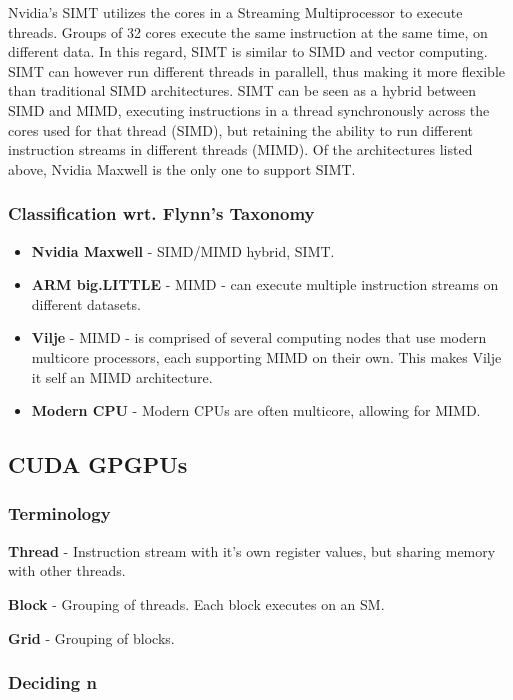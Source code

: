 \documentclass[paper=a4, fontsize=11pt]{scrartcl} %
\numberwithin{equation}{section} %
\numberwithin{figure}{section} %
\numberwithin{table}{section} %
\begin{document}
Nvidia's SIMT utilizes the cores in a Streaming Multiprocessor to execute threads.
Groups of 32 cores execute the same instruction at the same time, on different data.
In this regard, SIMT is similar to SIMD and vector computing.
SIMT can however run different threads in parallell, thus making it more flexible than traditional SIMD architectures.
SIMT can be seen as a hybrid between SIMD and MIMD, executing instructions in a thread synchronously across the cores used for that thread (SIMD), but retaining the ability to run different instruction streams in different threads (MIMD).
Of the architectures listed above, Nvidia Maxwell is the only one to support SIMT.

\subsubsection{Classification wrt. Flynn's Taxonomy}

\begin{itemize}
    \item \textbf{Nvidia Maxwell} - SIMD/MIMD hybrid, SIMT.
    \item \textbf{ARM big.LITTLE} - MIMD - can execute multiple instruction streams on different datasets.
    \item \textbf{Vilje} - MIMD - is comprised of several computing nodes that use modern multicore processors, each supporting MIMD on their own. This makes Vilje it self an MIMD architecture.
    \item \textbf{Modern CPU} - Modern CPUs are often multicore, allowing for MIMD.
\end{itemize}

\subsection{CUDA GPGPUs}

\subsubsection{Terminology}

\textbf{Thread} - Instruction stream with it's own register values, but sharing memory with other threads.

\textbf{Block} - Grouping of threads. Each block executes on an SM.

\textbf{Grid} - Grouping of blocks.

\subsubsection{Deciding n}
\end{document}
